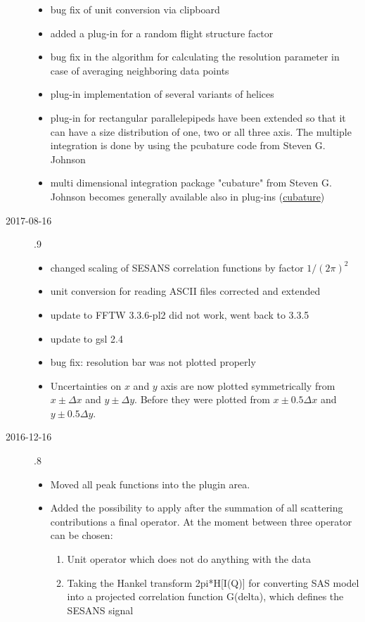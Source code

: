 \begin{description}
\begin{itemize}
    \item bug fix of unit conversion via clipboard
    \item added a plug-in for a random flight structure factor
    \item bug fix in the algorithm for calculating the resolution parameter in case of averaging neighboring data points
    \item  plug-in implementation of several variants of helices
    \item plug-in for rectangular parallelepipeds have been extended so that it can have a size distribution of one, two or all three axis. The multiple integration is done by using the pcubature code from  Steven G. Johnson
    \item multi dimensional integration package "cubature" from  Steven G. Johnson becomes generally available also in plug-ins (\href{https://github.com/stevengj/cubature}{cubature})
    \end{itemize}
\item[2017-08-16] .9
    \begin{itemize}
    \item changed scaling of SESANS correlation functions by factor $1/(2\pi)^2$
    \item unit conversion for reading ASCII files corrected and extended
    \item update to FFTW 3.3.6-pl2 did not work, went back to 3.3.5
    \item update to gsl 2.4
    \item bug fix: resolution bar was not plotted properly
    \item Uncertainties on $x$ and $y$ axis are now plotted symmetrically from $x\pm\Delta x$ and $y\pm\Delta y$.
          Before they were plotted from $x\pm0.5\Delta x$ and $y\pm0.5\Delta y$.
    \end{itemize}
\item[2016-12-16] .8
    \begin{itemize}
        \item Moved all peak functions into the plugin area.
        \item Added the possibility to apply after the summation of all scattering contributions a final operator.  At the moment between three operator can be chosen:
        \begin{enumerate}
            \item Unit operator which does not do anything with the data
            \item Taking the Hankel transform 2pi*H[I(Q)] for converting SAS model into a projected correlation function G(delta), which defines the SESANS signal

\end{enumerate}
\end{itemize}
\end{description}
